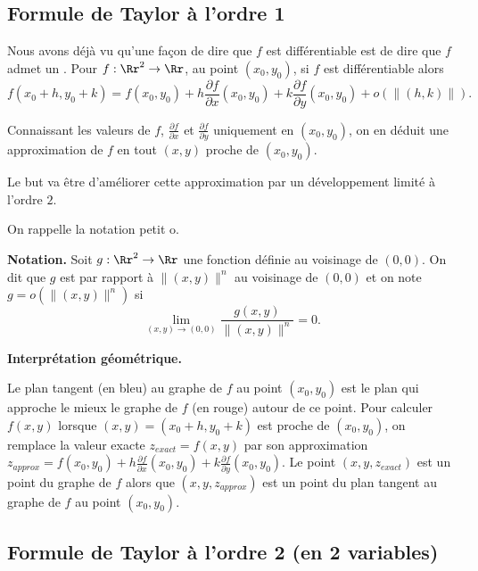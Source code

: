 \documentclass[11pt, class=report,crop=false]{standalone}
\begin{document}
\subsection{Formule de Taylor à l'ordre 1}

Nous avons déjà vu qu'une façon de dire que $f$ est différentiable est de dire que $f$ admet un . Pour $f : \Rr^2 \to \Rr$,
au point $(x_0,y_0)$, si $f$ est différentiable alors
$$f(x_0+h,y_0+k)=f(x_0,y_0)+h\frac{\partial f}{\partial x}(x_0,y_0)+k\frac{\partial f}{\partial y}(x_0,y_0)+o\left(\|(h,k)\|\right).$$

Connaissant les valeurs de $f$, $\frac{\partial f}{\partial x}$
et $\frac{\partial f}{\partial y}$ uniquement en $(x_0,y_0)$, on en déduit une approximation de $f$ en tout $(x,y)$ proche de $(x_0,y_0)$.

\medskip

Le but va être d'améliorer cette approximation par un développement limité à l'ordre $2$.

On rappelle la notation \og{}petit o\fg{}.

\textbf{Notation.} Soit $g :\Rr^2\to \Rr$ une fonction définie au voisinage de $(0,0)$. On dit que $g$ est  par rapport à $\|(x,y)\|^n$ au voisinage de $(0,0)$ et on note $g=o\left(\|(x,y)\|^n\right)$ si 
$$\lim_{(x,y)\to(0,0)}\frac{g(x,y)}{\|(x,y)\|^n}=0.$$

\textbf{Interprétation géométrique.}

Le plan tangent (en bleu) au graphe de $f$ au point $(x_0,y_0)$ est le plan qui approche le mieux le graphe de $f$ (en rouge) autour de ce point.
Pour calculer $f(x,y)$ lorsque $(x,y)=(x_0+h,y_0+k)$ est proche de $(x_0,y_0)$, on remplace la valeur exacte $z_{exact} = f(x,y)$ 
par son approximation $z_{approx} = f(x_0,y_0)+h\frac{\partial f}{\partial x}(x_0,y_0)+k\frac{\partial f}{\partial y}(x_0,y_0)$.
Le point $(x,y,z_{exact})$ est un point du graphe de $f$ alors que
$(x,y,z_{approx})$ est un point du plan tangent au graphe de $f$ au point $(x_0,y_0)$. 




\subsection{Formule de Taylor à l'ordre 2 (en 2 variables)}
\end{document}
